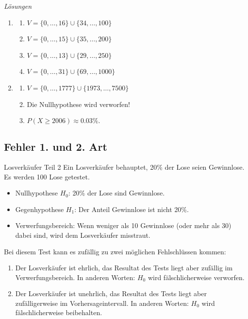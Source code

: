 \clearpage
\emph{Lösungen}
\begin{enumerate}
    \item
          \begin{enumerate}
              \item \(V=\{0, \dots, 16\} \cup \{34, \dots, 100\} \)
              \item \(V=\{0, \dots, 15\} \cup \{35, \dots, 200\} \)
              \item \(V=\{0, \dots, 13\} \cup \{29, \dots, 250\} \)
              \item \(V=\{0, \dots, 31\} \cup \{69, \dots, 1000\} \)
          \end{enumerate}
    \item \begin{enumerate}
              \item \(V=\{0, \dots, 1777\} \cup \{1973, \dots, 7500\} \)
              \item Die Nullhypothese wird verworfen!
              \item \(P(X\ge2006) \approx 0.03\%\).
          \end{enumerate}
\end{enumerate}





















\pagebreak
\subsection{Fehler 1. und 2. Art}
\begin{bsp}
    {Losverkäufer Teil 2}{}
    Ein Losverkäufer behauptet, 20\% der Lose seien Gewinnlose. Es werden 100 Lose getestet.
    \begin{itemize}
        \item Nullhypothese \( H_0 \): 20\% der Lose sind Gewinnlose.
        \item Gegenhypothese \( H_1 \): Der Anteil Gewinnlose ist nicht 20\%.
        \item Verwerfungsbereich: Wenn weniger als 10 Gewinnlose (oder mehr als 30) dabei sind, wird dem Losverkäufer misstraut.
    \end{itemize}


    Bei diesem Test kann es zufällig zu zwei möglichen Fehlschlüssen kommen:
    \begin{enumerate}
        \item Der Losverkäufer ist ehrlich, das Resultat des Tests liegt aber zufällig im Verwerfungsbereich. In anderen Worten: \(H_0\) wird fälschlicherweise verworfen.
        \item Der Losverkäufer ist unehrlich, das Resultat des Tests liegt aber zufälligerweise im Vorhersageintervall. In anderen Worten: \(H_0\) wird fälschlicherweise beibehalten.
    \end{enumerate}
\end{bsp}

